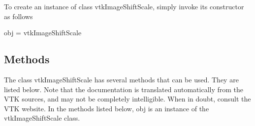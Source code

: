 To create an instance of class vtk\-Image\-Shift\-Scale, simply invoke its constructor as follows \begin{DoxyVerb}  obj = vtkImageShiftScale
\end{DoxyVerb}
 \hypertarget{vtkwidgets_vtkxyplotwidget_Methods}{}\subsection{Methods}\label{vtkwidgets_vtkxyplotwidget_Methods}
The class vtk\-Image\-Shift\-Scale has several methods that can be used. They are listed below. Note that the documentation is translated automatically from the V\-T\-K sources, and may not be completely intelligible. When in doubt, consult the V\-T\-K website. In the methods listed below, {\ttfamily obj} is an instance of the vtk\-Image\-Shift\-Scale class. 
